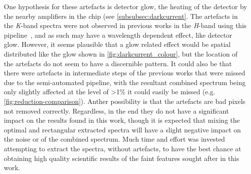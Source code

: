 One hypothesis for these artefacts is detector glow, the heating of the detector by the nearby amplifiers in the chip (see \cref{subsubsec:darkcurrent}.
The artefacts in the \emph{K}-band spectra were not observed in previous works in the \emph{H}-band using this pipeline~\citep[e.g.][]{figueira_radial_2010}, and as such may have a wavelength dependent effect, like detector glow.
However, it seems plausible that a glow related effect would be spatial distributed like the glow shown in \cref{fig:darkcurrent_colour}, but the location of the artefacts do not seem to have a discernible pattern.
It could also be that there were artefacts in intermediate steps of the previous works that were missed due to the semi-automated pipeline, with the resultant combined spectrum being only slightly affected at the level of >1\% it could easily be missed (e.g. \cref{fig:reduction-comparison}).
Anther possibility is that the artefacts are bad pixels not removed correctly.
Regardless, in the end they do not have a significant impact on the results found in this work, though it is expected that mixing the optimal and rectangular extracted spectra will have a slight negative impact on the noise or \snr{} of the combined spectrum.
Much time and effort was invested attempting to extract the spectra, without artefacts, to have the best chance at obtaining high quality scientific results of the faint features sought after in this work.
